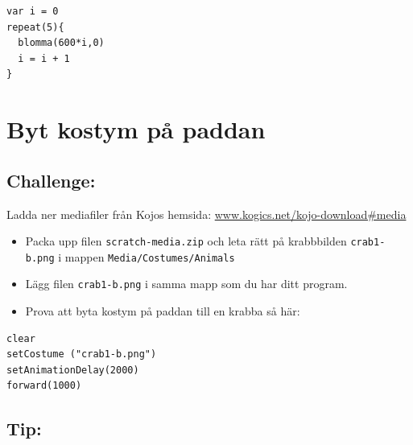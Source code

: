 \begin{lstlisting}[basicstyle={\ttfamily\fontsize{18}{22}\selectfont},numbers=none]
var i = 0          
repeat(5){
  blomma(600*i,0)
  i = i + 1        
}
\end{lstlisting}
        
\chapter{Byt kostym på paddan}\section*{\color{BrickRed}Challenge:}
Ladda ner mediafiler från Kojos hemsida:
\href{http://www.kogics.net/kojo-download#media}{www.kogics.net/kojo-download\#media}


\begin{itemize}

\item {Packa upp filen \lstinline{scratch-media.zip} och leta rätt på krabbbilden \lstinline{crab1-b.png} i mappen \lstinline{Media/Costumes/Animals}}
\item {Lägg filen \lstinline{crab1-b.png} i samma mapp som du har ditt program.}
\item {Prova att byta kostym på paddan till en krabba så här:}

\end{itemize}



  

\begin{lstlisting}[basicstyle={\ttfamily\fontsize{20}{24}\selectfont},numbers=none]
clear
setCostume ("crab1-b.png")  
setAnimationDelay(2000)
forward(1000)
\end{lstlisting}
        
\section*{\color{OliveGreen}Tip:}


